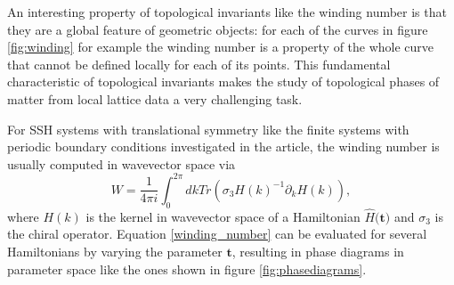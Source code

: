 \documentclass[fleqn,10pt]{wlscirep}
\begin{document}
An interesting property of topological invariants like the winding number is that they are a global feature of geometric objects: for each of the curves in figure \ref{fig:winding} for example the winding number is a property of the whole curve that cannot be defined locally for each of its points. This fundamental characteristic of topological invariants makes the study of topological phases of matter from local lattice data a very challenging task.   

For SSH systems with translational symmetry like the finite systems with periodic boundary conditions investigated in the article, the winding number is usually computed in wavevector space via
\begin{equation}\label{winding_number}
W=\frac{1}{4\pi i}\int_0^{2\pi} dk Tr( \sigma_3 H(k)^{-1} \partial_k H(k)),
\end{equation}
where $H(k)$ is the kernel in wavevector space of a Hamiltonian $\hat{H}$$($$\mathbf{t}$$)$ and $\sigma_3$ is the chiral operator. Equation \eqref{winding_number} can be evaluated for several Hamiltonians by varying the parameter $\mathbf{t}$, resulting in phase diagrams in parameter space like the ones shown in figure \ref{fig:phasediagrams}.
\end{document}
